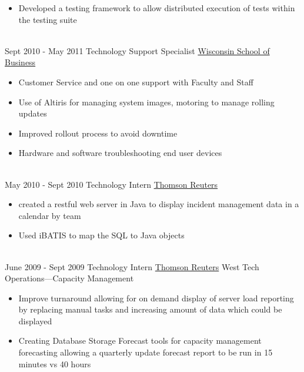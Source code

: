 \documentclass[letterpaper]{twentysecondcv} %
\begin{document}
\begin{twenty}
{{\begin{itemize}
        \item Developed a testing framework to allow distributed execution of tests within the testing suite
        
    \end{itemize}}
        }
    \\   
    \twentyitem
   		{Sept 2010 -}
		{May 2011}
        {Technology Support Specialist}
        {\href{https://wsb.wisc.edu/}{Wisconsin School of Business}}
        {}
        {
        {\begin{itemize}
		\item Customer Service and one on one support with Faculty and Staff
		\item Use of Altiris for managing system images, motoring to manage rolling updates
		\item Improved rollout process to avoid downtime
		\item Hardware and software troubleshooting end user devices
    \end{itemize}}
        }
     \\
     \twentyitem
	    {May 2010 -}
	    {Sept 2010}
	   	{Technology Intern}
        {\href{https://www.thomsonreuters.com}{Thomson Reuters}}
        {}
        {
        \begin{itemize}
        \item created a restful web server in Java to display incident management data in a calendar by team 
        \item Used iBATIS to map the SQL to Java objects
        
    \end{itemize}
    	}
    \\
    \twentyitem
	   {June 2009 -}
	   {Sept 2009}
       {Technology Intern}
       {\href{https://www.thomsonreuters.com}{Thomson Reuters}}
       {West Tech Operations—Capacity Management}
       {
       	\begin{itemize}
       		\item Improve turnaround allowing for on demand display of server load reporting by replacing manual tasks and increasing amount of data which could be displayed
       		\item Creating Database Storage  Forecast tools for capacity management forecasting allowing a quarterly update forecast report to be run in 15 minutes vs 40 hours
       		
       	\end{itemize}
       } 
\end{twenty}
\end{document}
